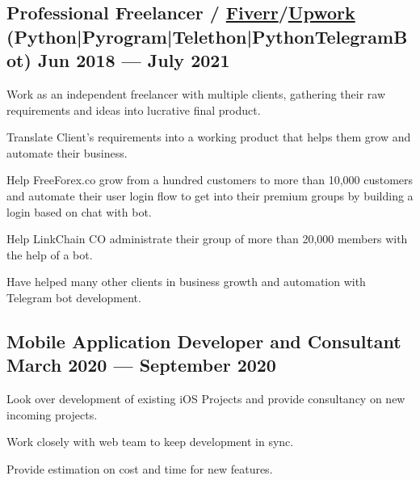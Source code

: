 \documentclass[letter,10pt]{article}
\begin{document}
\subsection{{Professional Freelancer / \href{https://www.fiverr.com/users/takausrazeem}{Fiverr}/\href{https://www.upwork.com/freelancers/~018bcc7acbf1d3e149}{Upwork} (Python|Pyrogram|Telethon|PythonTelegramBot) \hfill Jun 2018 --- July 2021}}
\begin{zitemize}
\item Work as an independent freelancer with multiple clients, gathering their raw requirements and ideas into lucrative final product.
\item Translate Client's requirements into a working product that helps them grow and automate their business.
\item Help FreeForex.co grow from a hundred customers to more than 10,000 customers and automate their user login flow to get into their premium groups by building a login based on chat with bot.
\item Help LinkChain CO administrate their group of more than 20,000 members with the help of a bot.
\item Have helped many other clients in business growth and automation with Telegram bot development.
\end{zitemize}

\subsection{{Mobile Application Developer and Consultant \hfill March 2020 --- September 2020}}
\begin{zitemize}
\item Look over development of existing iOS Projects and provide consultancy on new incoming projects.
\item Work closely with web team to keep development in sync.
\item Provide estimation on cost and time for new features.
\end{zitemize}

\end{document}
